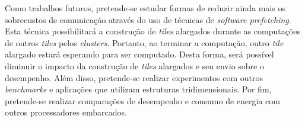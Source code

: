 Como trabalhos futuros, pretende-se estudar formas de reduzir ainda mais os
sobrecustos de comunicação através do uso de técnicas de \textit{software
    prefetching}. Esta técnica possibilitará a construção de \textit{tiles}
alargados durante as computações de outros \textit{tiles} pelos
\textit{clusters}. Portanto, ao terminar a computação, outro \textit{tile}
alargado estará esperando para ser computado. Desta forma, será possível
diminuir o impacto da construção de \textit{tiles} alargados e seu envio sobre o
desempenho.
Além disso, pretende-se realizar experimentos com outros
\textit{benchmarks} e aplicações que utilizam estruturas tridimensionais. Por
fim, pretende-se realizar comparações de desempenho e consumo de energia com
outros processadores embarcados.

